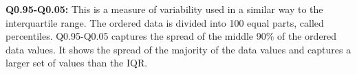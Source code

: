 \textbf{Q0.95-Q0.05:} This is a measure of variability used in a similar
way to the interquartile range.
The ordered data is divided into 100 equal parts, called percentiles. Q0.95-Q0.05 captures the
spread of the middle 90\% of the ordered data values. It shows the spread
of the majority of the data values and captures a larger set of values than the IQR.

